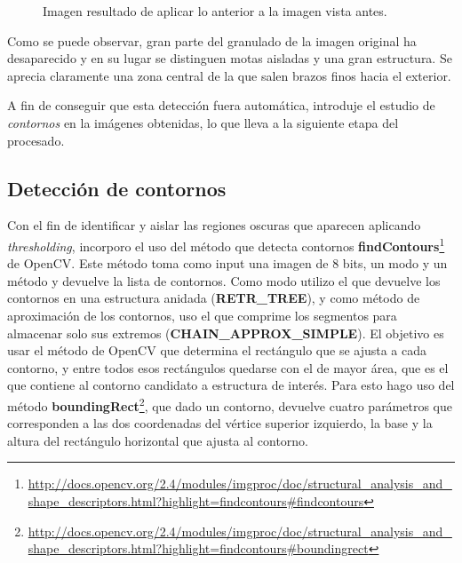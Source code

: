 \documentclass[a4paper,12pt]{article}
\begin{document}
\begin{figure}[h!]
\centering
{}
\caption{Imagen resultado de aplicar lo anterior a la imagen vista antes.}
\label{fig:img2}
\end{figure}

Como se puede observar, gran parte del granulado de la imagen original ha desaparecido y en su lugar se distinguen motas aisladas y una gran estructura. Se aprecia claramente una zona central de la que salen brazos finos hacia el exterior.

A fin de conseguir que esta detección fuera automática, introduje el estudio de \textit{contornos} en la imágenes obtenidas, lo que lleva a la siguiente etapa del procesado.

\subsection{Detección de contornos}
Con el fin de identificar y aislar las regiones oscuras que aparecen aplicando \textit{thresholding}, incorporo el uso del método que detecta contornos \textbf{findContours}\footnote{\url{http://docs.opencv.org/2.4/modules/imgproc/doc/structural_analysis_and_shape_descriptors.html?highlight=findcontours#findcontours}} de OpenCV. Este método toma como input una imagen de 8 bits, un modo y un método y devuelve la lista de contornos. Como modo utilizo el que devuelve los contornos en una estructura anidada (\textbf{RETR\_TREE}), y como método de aproximación de los contornos, uso el que comprime los segmentos para almacenar solo sus extremos (\textbf{CHAIN\_APPROX\_SIMPLE}). El objetivo es usar el método de OpenCV que determina el rectángulo que se ajusta a cada contorno, y entre todos esos rectángulos quedarse con el de mayor área, que es el que contiene al contorno candidato a estructura de interés. Para esto hago uso del método \textbf{boundingRect}\footnote{\url{http://docs.opencv.org/2.4/modules/imgproc/doc/structural_analysis_and_shape_descriptors.html?highlight=findcontours#boundingrect}}, que dado un contorno, devuelve cuatro parámetros que corresponden a las dos coordenadas del vértice superior izquierdo, la base y la altura del rectángulo horizontal que ajusta al contorno.
\end{document}
